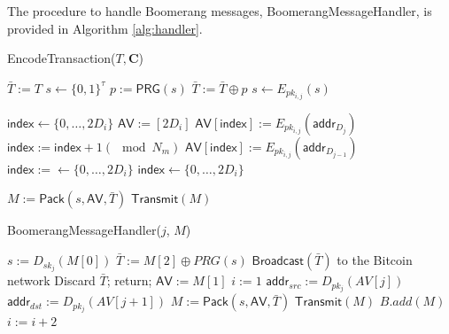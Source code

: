 The procedure to handle Boomerang messages, {\sf BoomerangMessageHandler}, is provided in Algorithm \ref{alg:handler}. 

\begin{algorithm*}[t!]
\caption{{\sf EncodeTransaction}($T, \mathbf{C}$)}
\label{alg:encode}
\begin{algorithmic}[1]

	\State $\bar{T} := T$
	\State $s \gets \{0,1\}^{\tau}$
		\State $p := \mathsf{PRG}(s)$
		\State $\bar{T} := \bar{T} \oplus p$
		\State $s \gets E_{pk_{i,j}}(s)$
	\EndFor

	\State $\mathsf{index} \gets \{0,\dots,2D_i\}$ %
	\State $\mathsf{AV} := [2D_i]$ %
		\State $\mathsf{AV}[\mathsf{index}] := E_{pk_{i,j}}(\mathsf{addr}_{D_j})$
		\State $\mathsf{index} := \mathsf{index} + 1 (\mod N_m)$
		\State $\mathsf{AV}[\mathsf{index}] := E_{pk_{i,j}}(\mathsf{addr}_{D_{j-1}})$
		\State $\mathsf{index} := \gets \{0,\dots,2D_i\}$
			\State $\mathsf{index} \gets \{0,\dots,2D_i\}$
		\EndWhile
	\EndFor

	\State $M := \mathsf{Pack}(s, \mathsf{AV}, \bar{T})$
	\State $\mathsf{Transmit}(M)$
\EndFor

\end{algorithmic}
\end{algorithm*}

\begin{algorithm*}[t!]
\caption{{\sf BoomerangMessageHandler}($j$, $M$)}
\label{alg:handler}
\begin{algorithmic}[1]

\State $s := D_{sk_{j}}(M[0])$
\State $\bar{T} := M[2] \oplus PRG(s)$
	\State $\mathsf{Broadcast}(\bar{T})$ to the Bitcoin network
	\State Discard $\bar{T}$; return;
\Else
	\State $\mathsf{AV} := M[1]$
	\State $i := 1$
		\State $\mathsf{addr}_{src} := D_{pk_j}(AV[j])$
			\State $\mathsf{addr}_{dst} := D_{pk_j}(AV[j + 1])$
			\State $M := \mathsf{Pack}(s, \mathsf{AV}, \bar{T})$
				\State $\mathsf{Transmit}(M)$
			\Else
				\State $B.add(M)$
			\EndIf
		\Else
			\State $i := i + 2$
		\EndIf
	\EndWhile
\EndIf

\end{algorithmic}
\end{algorithm*}

